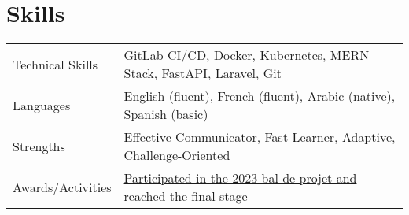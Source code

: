\documentclass[a4paper,11pt]{article}
\begin{document}
\section{Skills}
\begin{tabularx}{\linewidth}{@{}l X@{}}
Technical Skills & \normalsize{GitLab CI/CD, Docker, Kubernetes, MERN Stack, FastAPI, Laravel, Git}\\
Languages & \normalsize{English (fluent), French (fluent), Arabic (native), Spanish (basic)}\\
Strengths & \normalsize{Effective Communicator, Fast Learner, Adaptive, Challenge-Oriented}\\
Awards/Activities & \normalsize{\href{https://drive.google.com/file/d/16UhAiNxRB6kH4zVj_1JtAkfX1AmlOMHL/view}{Participated in the 2023 bal de projet and reached the final stage}}\\
\end{tabularx}
\end{document}
